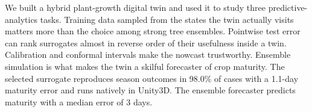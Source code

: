\documentclass[conference]{IEEEtran}
\begin{document}
We built a hybrid plant-growth digital twin and used it to study three predictive-analytics
tasks. Training data sampled from the states the twin actually visits matters more than the
choice among strong tree ensembles. Pointwise test error can rank surrogates almost in reverse
order of their usefulness inside a twin. Calibration and conformal intervals make the nowcast
trustworthy. Ensemble simulation is what makes the twin a skilful forecaster of crop maturity.
The selected surrogate reproduces season outcomes in 98.0\% of cases with a 1.1-day
maturity error and runs natively in Unity3D. The ensemble forecaster predicts maturity with a
median error of 3 days.


\balance
\end{document}
